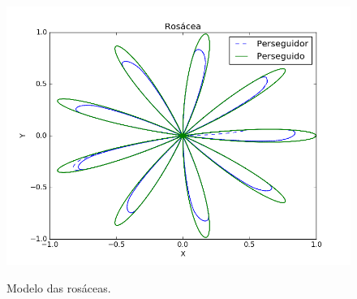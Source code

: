 \documentclass[a4paper,10pt]{article}
\begin{document}
  \begin{figure}[H]
   \includegraphics[width=\textwidth]{rosacea.png}
   \label{fig:rosace}
   \caption{Modelo das rosáceas.}
  \end{figure}
  
\end{document}
